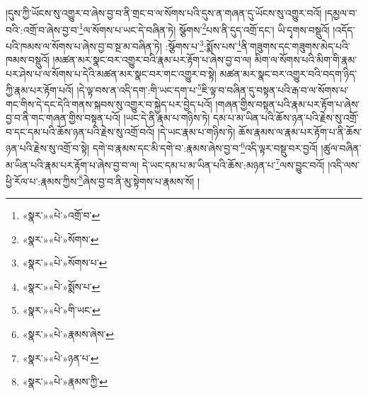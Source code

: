 །དུས་ཀྱི་ཡོངས་སུ་འགྱུར་བ་ཞེས་བྱ་བ་ནི་གྲང་བ་ལ་སོགས་པའི་དུས་ན་གཞན་དུ་ཡོངས་སུ་འགྱུར་བའོ། །དམྱལ་བ་བའི་:འགྲོ་བ་ཞེས་བྱ་བ་\footnote{«སྣར་»«པེ་»འགྲོ་བ་}ལ་སོགས་པ་ཡང་དེ་བཞིན་ཏེ། སྩོགས་\footnote{«སྣར་»«པེ་»སོགས་}པས་ནི་དུད་འགྲོ་དང་། ཡི་དྭགས་བསྡུའོ། །འདོད་པའི་ཁམས་ལ་སོགས་པ་ཞེས་བྱ་བ་སྔ་མ་བཞིན་ཏེ། :སྩོགས་པ་\footnote{«སྣར་»«པེ་»སོགས་པ་}:སྨོས་པས་\footnote{«སྣར་»«པེ་»སྨོས་པ་}ནི་གཟུགས་དང་གཟུགས་མེད་པའི་ཁམས་བསྡུའོ། །མཚན་མར་སྣང་བར་འགྱུར་བའི་རྣམ་པར་རྟོག་པ་ཞེས་བྱ་བ་ལ། མིག་ལ་སོགས་པའི་མིག་གི་རྣམ་པར་ཤེས་པ་ལ་སོགས་པ་དེའི་མཚན་མར་སྣང་བར་གང་འགྱུར་བ་སྟེ། མཚན་མར་སྣང་བར་འགྱུར་བའི་བདག་ཉིད་ཀྱི་རྣམ་པར་རྟོག་པའོ། །དེ་ལྟ་བས་ན་འདི་དག་:གི་ཡང་དག་པ་\footnote{«སྣར་»«པེ་»གི་ཡང་}ཇི་ལྟ་བ་བཞིན་དུ་བསྟན་པའི་རྒ་བ་ལ་སོགས་པ་གང་གིས་དེ་དང་དེའི་གནས་སྐབས་སུ་འགྱུར་བ་སྐྱེད་པར་བྱེད་པའོ། །གཞན་གྱིས་བསྟན་པའི་རྣམ་པར་རྟོག་པ་ཞེས་བྱ་བ་ནི་གང་གཞན་གྱིས་བསྟན་པའོ། །ཡང་དེ་ནི་རྣམ་པ་གཉིས་ཏེ། དམ་པ་མ་ཡིན་པའི་ཆོས་ཉན་པའི་རྗེས་སུ་འགྲོ་བ་དང་དམ་པའི་ཆོས་ཉན་པའི་རྗེས་སུ་འགྲོ་བའོ། །དེ་ཡང་རྣམ་པ་གཉིས་ཏེ། ཆོས་རྣམས་ལ་རྣམ་པར་རྟོག་པ་ནི་ཆོས་ཉན་པའི་རྗེས་སུ་འགྲོ་བ་སྟེ། དགེ་བ་རྣམས་དང་མི་དགེ་བ་:རྣམས་ཞེས་བྱ་བ་\footnote{«སྣར་»«པེ་»རྣམས་ཞེས་}འདི་ལྟར་བསྡུ་བར་བྱའོ། །ཚུལ་བཞིན་མ་ཡིན་པའི་རྣམ་པར་རྟོག་པ་ཞེས་བྱ་བ་ལ། དེ་ཡང་དམ་པ་མ་ཡིན་པའི་ཆོས་:མཉན་པ་\footnote{«སྣར་»«པེ་»ཉན་པ་}ལས་བྱུང་བའོ། །འདི་ལས་ཕྱི་རོལ་པ་:རྣམས་ཀྱིས་\footnote{«སྣར་»«པེ་»རྣམས་ཀྱི་}ཞེས་བྱ་བ་ནི་མུ་སྟེགས་པ་རྣམས་སོ། །
